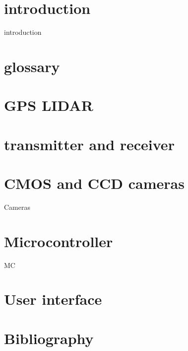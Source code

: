 \documentclass{article}
\begin{document}
\tableofcontents
\clearpage

\section{introduction}
{introduction}
\clearpage

\section{glossary}

\section{GPS LIDAR}

\section{transmitter and receiver}

\section{CMOS and CCD cameras}
{Cameras}
\clearpage

\section{Microcontroller}
{MC}
\clearpage

\section{User interface}

\section{Bibliography}
\end{document}
